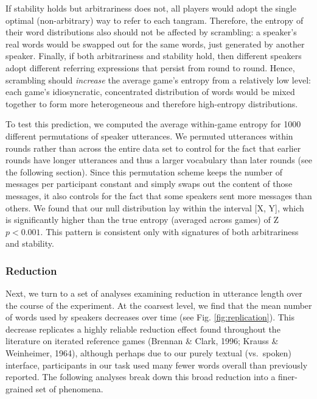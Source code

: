 \documentclass[manuscript]{stjour}
\begin{document}
If stability holds but arbitrariness does not, all players would adopt
the single optimal (non-arbitrary) way to refer to each tangram.
Therefore, the entropy of their word distributions also should not be
affected by scrambling: a speaker's real words would be swapped out for
the same words, just generated by another speaker. Finally, if both
arbitrariness and stability hold, then different speakers adopt
different referring expressions that persist from round to round. Hence,
scrambling should \emph{increase} the average game's entropy from a
relatively low level: each game's idiosyncratic, concentrated
distribution of words would be mixed together to form more heterogeneous
and therefore high-entropy distributions.

To test this prediction, we computed the average within-game entropy for
1000 different permutations of speaker utterances. We permuted
utterances within rounds rather than across the entire data set to
control for the fact that earlier rounds have longer utterances and thus
a larger vocabulary than later rounds (see the following section). Since
this permutation scheme keeps the number of messages per participant
constant and simply swaps out the content of those messages, it also
controls for the fact that some speakers sent more messages than others.
We found that our null distribution lay within the interval {[}X, Y{]},
which is significantly higher than the true entropy (averaged across
games) of Z \(p < 0.001\). This pattern is consistent only with
signatures of both arbitrariness and stability.

\subsubsection{Reduction}\label{reduction}

Next, we turn to a set of analyses examining reduction in utterance
length over the course of the experiment. At the coarsest level, we find
that the mean number of words used by speakers decreases over time (see
Fig. \ref{fig:replication}). This decrease replicates a highly reliable
reduction effect found throughout the literature on iterated reference
games (Brennan \& Clark, 1996; Krauss \& Weinheimer, 1964), although
perhaps due to our purely textual (vs.~spoken) interface, participants
in our task used many fewer words overall than previously reported. The
following analyses break down this broad reduction into a finer-grained
set of phenomena.
\end{document}
